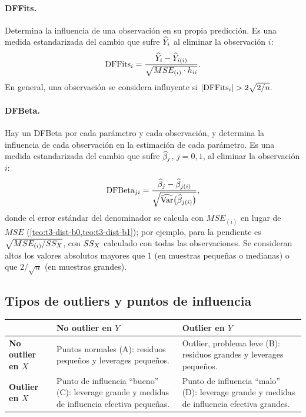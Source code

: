 \paragraph{DFFits.} Determina la influencia de una observación en su propia predicción. Es una
medida estandarizada del cambio que sufre $\widehat{Y}_i$ al eliminar la observación $i$:
\[
  \mathrm{DFFits}_i = \frac{\widehat{Y}_i-\widehat{Y}_{i(i)}}{\sqrt{MSE_{(i)}\cdot h_{ii}}} .
\]
En general, una observación se considera influyente si
\(
  |\mathrm{DFFits}_i| > 2\sqrt{2/n} .
\)

\paragraph{DFBeta.} Hay un DFBeta por cada parámetro y cada observación, y determina la influencia
de cada observación en la estimación de cada parámetro. Es una medida estandarizada del cambio que
sufre $\widehat{\beta}_j$, $j=0,1$, al eliminar la observación $i$:
\[
  \mathrm{DFBeta}_{ji} = \frac{\widehat{\beta}_j-\widehat{\beta}_{j(i)}}{\sqrt{\widehat{\operatorname{Var}}\big(\widehat{\beta}_{j(i)}\big)}},
\]
donde el error estándar del denominador se calcula con $MSE_{(i)}$ en lugar de $MSE$
(\cref{teo:t3-dist-b0,teo:t3-dist-b1}); por ejemplo, para la pendiente es
$\sqrt{MSE_{(i)}/SS_X}$, con $SS_X$ calculado con todas las observaciones. Se consideran altos los valores absolutos mayores que 1 (en muestras
pequeñas o medianas) o que $2/\sqrt{n}$ (en muestras grandes).

\subsection{Tipos de outliers y puntos de influencia}

\begin{center}
  \small
  \renewcommand{\arraystretch}{1.3}
  \begin{tabular}{l>{\raggedright\arraybackslash}p{4.6cm}>{\raggedright\arraybackslash}p{4.6cm}}
    \toprule
    & \textbf{No outlier en $Y$} & \textbf{Outlier en $Y$} \\
    \midrule
    \textbf{No outlier en $X$} &
      Puntos normales (A): residuos pequeños y leverages pequeños. &
      Outlier, problema leve (B): residuos grandes y leverages pequeños. \\
    \addlinespace
    \textbf{Outlier en $X$} &
      Punto de influencia ``bueno'' (C): leverage grande y medidas de influencia efectiva
      pequeñas. &
      Punto de influencia ``malo'' (D): leverage grande y medidas de influencia efectiva
      grandes. \\
    \bottomrule
  \end{tabular}
\end{center}


